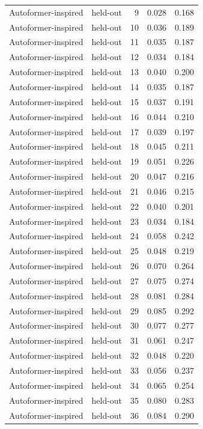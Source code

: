 \begin{tabular}{llrrr}
Autoformer-inspired & held-out & 9 & 0.028 & 0.168 \\
Autoformer-inspired & held-out & 10 & 0.036 & 0.189 \\
Autoformer-inspired & held-out & 11 & 0.035 & 0.187 \\
Autoformer-inspired & held-out & 12 & 0.034 & 0.184 \\
Autoformer-inspired & held-out & 13 & 0.040 & 0.200 \\
Autoformer-inspired & held-out & 14 & 0.035 & 0.187 \\
Autoformer-inspired & held-out & 15 & 0.037 & 0.191 \\
Autoformer-inspired & held-out & 16 & 0.044 & 0.210 \\
Autoformer-inspired & held-out & 17 & 0.039 & 0.197 \\
Autoformer-inspired & held-out & 18 & 0.045 & 0.211 \\
Autoformer-inspired & held-out & 19 & 0.051 & 0.226 \\
Autoformer-inspired & held-out & 20 & 0.047 & 0.216 \\
Autoformer-inspired & held-out & 21 & 0.046 & 0.215 \\
Autoformer-inspired & held-out & 22 & 0.040 & 0.201 \\
Autoformer-inspired & held-out & 23 & 0.034 & 0.184 \\
Autoformer-inspired & held-out & 24 & 0.058 & 0.242 \\
Autoformer-inspired & held-out & 25 & 0.048 & 0.219 \\
Autoformer-inspired & held-out & 26 & 0.070 & 0.264 \\
Autoformer-inspired & held-out & 27 & 0.075 & 0.274 \\
Autoformer-inspired & held-out & 28 & 0.081 & 0.284 \\
Autoformer-inspired & held-out & 29 & 0.085 & 0.292 \\
Autoformer-inspired & held-out & 30 & 0.077 & 0.277 \\
Autoformer-inspired & held-out & 31 & 0.061 & 0.247 \\
Autoformer-inspired & held-out & 32 & 0.048 & 0.220 \\
Autoformer-inspired & held-out & 33 & 0.056 & 0.237 \\
Autoformer-inspired & held-out & 34 & 0.065 & 0.254 \\
Autoformer-inspired & held-out & 35 & 0.080 & 0.283 \\
Autoformer-inspired & held-out & 36 & 0.084 & 0.290 \\

\end{tabular}
